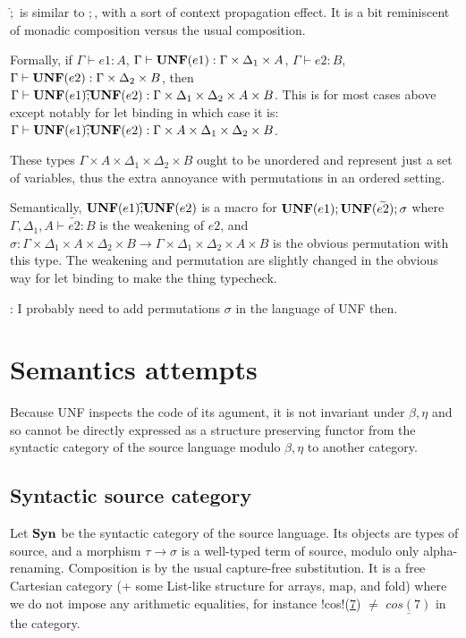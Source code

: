 $\widehat{;}$ is similar to $;$, with a sort of context propagation effect. 
It is a bit reminiscent of monadic composition versus the usual composition.

Formally, if $\Gamma\vdash e1: A$, $\Gamma\vdash \mathbf{UNF}(e1): \Gamma\times\Delta_1\times A$, $\Gamma\vdash e2: B$, $\Gamma\vdash \mathbf{UNF}(e2): \Gamma\times\Delta_2\times B$, then $\Gamma\vdash \mathbf{UNF}(e1) \widehat{;} \mathbf{UNF}(e2): \Gamma\times \Delta_1\times \Delta_2 \times A \times B$.
This is for most cases above except notably for let binding in which case it is: 
 $\Gamma\vdash \mathbf{UNF}(e1) \widehat{;} \mathbf{UNF}(e2): \Gamma\times A \times \Delta_1\times \Delta_2 \times B$. 

 These types $\Gamma\times A \times \Delta_1\times \Delta_2 \times B$ ought to be unordered and represent just a set of variables, thus the extra annoyance with permutations in an ordered setting. 

 Semantically, $\mathbf{UNF}(e1) \widehat{;} \mathbf{UNF}(e2)$ is a macro for $\mathbf{UNF}(e1) ; \mathbf{UNF}(\widetilde{e2}); \sigma$ where $\Gamma,\Delta_1,A\vdash \widetilde{e2}:B$ is the weakening of $e2$, and $\sigma: \Gamma\times\Delta_1\times A \times \Delta_2 \times B \to \Gamma\times\Delta_1\times \Delta_2 \times A\times B$ is the obvious permutation with this type.
The weakening and permutation are slightly changed in the obvious way for let binding to make the thing typecheck. 


 : I probably need to add permutations $\sigma$ in the language of UNF then.


\section{Semantics attempts}

Because UNF inspects the code of its agument, it is not invariant under $\beta,\eta$ and so cannot be directly expressed as a structure preserving functor from the syntactic category of the source language modulo $\beta,\eta$ to another category. 

\subsection{Syntactic source category}

Let $\mathbf{Syn}$ be the syntactic category of the source language. Its objects are types of source, and a morphism $\tau \to \sigma$ is a well-typed term of source, modulo only alpha-renaming. Composition is by the usual capture-free substitution. It is a free Cartesian category (+ some List-like structure for arrays, map, and fold) where we do not impose any arithmetic equalities, for instance !cos!(\underline{7}) $\neq$ $\underline{cos(7)}$ in the category.


